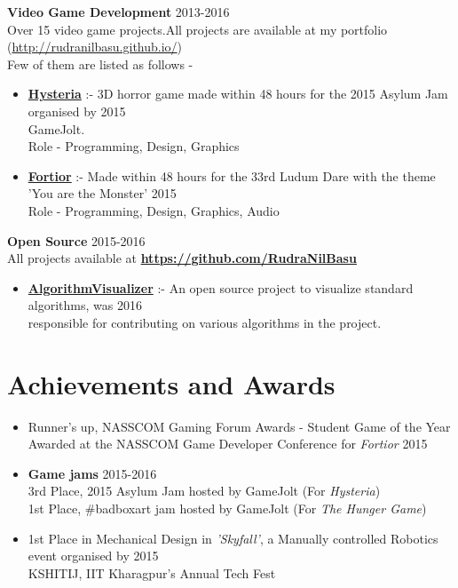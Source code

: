 \documentclass[margin, centered]{res}
\begin{document}
\begin{resume}

\textbf{Video Game Development} \hfill 2013-2016\\
Over 15 video game projects.All projects are available at my portfolio (\href{http://rudranilbasu.github.io/}{http://rudranilbasu.github.io/})\\
Few of them are listed as follows - 

\begin{itemize}[leftmargin=*]
	\item \textbf{\href{http://gamejolt.com/games/hysteria/107191}{Hysteria}} :- 3D horror game made within 48 hours for the 2015 Asylum Jam organised by \hfill 2015 \\GameJolt. \\Role - Programming, Design, Graphics
	\item \textbf{\href{http://gamejolt.com/games/fortior/88093}{Fortior}} :- Made within 48 hours for the 33rd Ludum Dare with the theme 'You are the Monster' \hfill 2015
	\\Role - Programming, Design, Graphics, Audio
\end{itemize}


\textbf{Open Source} \hfill 2015-2016\\
All projects available at \textbf{\href{https://github.com/RudraNilBasu}{https://github.com/RudraNilBasu}}
\begin{itemize}[leftmargin=*]
	\item \textbf{\href{https://github.com/parkjs814/AlgorithmVisualizer}{AlgorithmVisualizer}} :- An open source project to visualize standard algorithms, was \hfill 2016 \\
responsible for contributing on various algorithms in the project.

	
\end{itemize}

\section{Achievements and Awards}
\begin{itemize}[leftmargin=*]
\item Runner's up, NASSCOM Gaming Forum Awards - Student Game of the Year\\ 
Awarded at the NASSCOM Game Developer Conference for \textit{Fortior} \hfill 2015
\item \textbf{Game jams} \hfill 2015-2016
\\
3rd Place, 2015 Asylum Jam hosted by GameJolt (For \textit{Hysteria})\\
1st Place, \#badboxart jam hosted by GameJolt (For \textit{The Hunger Game})
\item 1st Place in Mechanical Design in \textit{'Skyfall'}, a Manually controlled Robotics event organised by \hfill2015 \\ KSHITIJ, IIT Kharagpur's Annual Tech Fest
\end{itemize}


\end{resume}
\end{document}
